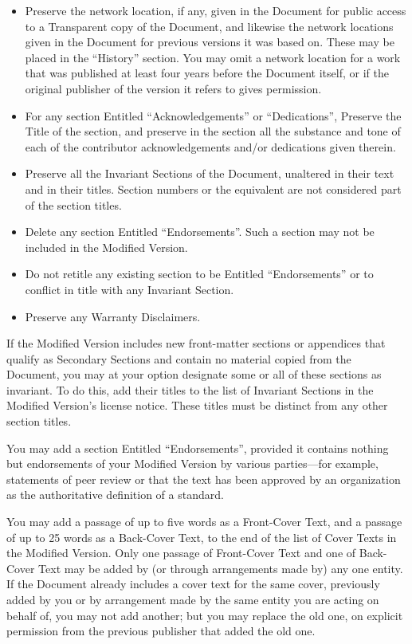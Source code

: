\begin{itemize}
\item[J.]
  Preserve the network location, if any, given in the
  Document for public access to a Transparent copy of the
  Document, and likewise the network locations given in
  the Document for previous versions it was based on.
  These may be placed in the \enquote{History} section. You
  may omit a network location for a work that was published
  at least four years before the Document itself, or if the
  original publisher of the version it refers to gives
  permission.

\item[K.]
  For any section Entitled \enquote{Acknowledgements} or
  \enquote{Dedications}, Preserve the Title of the section,
  and preserve in the section all the substance and tone of
  each of the contributor acknowledgements and/or
  dedications given therein.

\item[L.]
  Preserve all the Invariant Sections of the Document,
  unaltered in their text and in their titles. Section
  numbers or the equivalent are not considered part of the
  section titles.

\item[M.]
  Delete any section Entitled \enquote{Endorsements}. Such a
  section may not be included in the Modified Version.

\item[N.]
  Do not retitle any existing section to be Entitled
  \enquote{Endorsements} or to conflict in title with any
  Invariant Section.

\item[O.]
  Preserve any Warranty Disclaimers.
\end{itemize}

If the Modified Version includes new front-matter sections
or appendices that qualify as Secondary Sections and
contain no material copied from the Document, you may at
your option designate some or all of these sections as
invariant. To do this, add their titles to the list of
Invariant Sections in the Modified Version's license
notice. These titles must be distinct from any other
section titles.

You may add a section Entitled \enquote{Endorsements},
provided it contains nothing but endorsements of your
Modified Version by various parties---for example,
statements of peer review or that the text has been approved
by an organization as the authoritative definition of a
standard.

You may add a passage of up to five words as a Front-Cover
Text, and a passage of up to 25 words as a Back-Cover Text,
to the end of the list of Cover Texts in the Modified
Version. Only one passage of Front-Cover Text and one of
Back-Cover Text may be added by (or through arrangements
made by) any one entity. If the Document already includes a
cover text for the same cover, previously added by you or by
arrangement made by the same entity you are acting on behalf
of, you may not add another; but you may replace the old
one, on explicit permission from the previous publisher that
added the old one.

